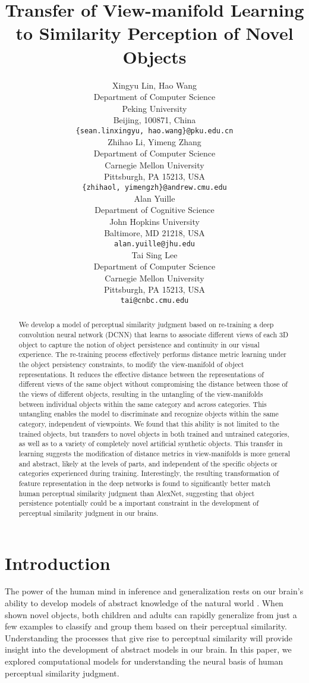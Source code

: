 \documentclass{article} %
\title{Transfer of View-manifold Learning to Similarity Perception of Novel Objects}
\author{Xingyu Lin, Hao Wang\\
Department of Computer Science\\
Peking University\\
Beijing, 100871, China \\
\texttt{\{sean.linxingyu, hao.wang\}@pku.edu.cn}\\
\And
Zhihao Li, Yimeng Zhang\\
Department of Computer Science\\
Carnegie Mellon University\\
Pittsburgh, PA 15213, USA \\
\texttt{\{zhihaol, yimengzh\}@andrew.cmu.edu} \\
\AND
Alan Yuille\\
Department of Cognitive Science\\
John Hopkins University\\
Baltimore, MD 21218, USA\\
\texttt{alan.yuille@jhu.edu} \\
\And
Tai Sing Lee\\
Department of Computer Science\\
Carnegie Mellon University\\
Pittsburgh, PA 15213, USA \\
\texttt{tai@cnbc.cmu.edu} \\
}
\begin{document}
\maketitle

\begin{abstract}
We develop a model of perceptual similarity judgment based on re-training a deep convolution neural network (DCNN) that learns to associate different views of each 3D object to capture the notion of object persistence and continuity in our visual experience. The re-training process effectively performs distance metric learning under the object persistency constraints, to modify the view-manifold of object representations. It reduces the effective distance between the representations of different views of the same object without compromising the distance between those of the views of different objects, resulting in the untangling of the view-manifolds between individual objects within the same category and across categories. This untangling enables the model to discriminate and recognize objects within the same category, independent of viewpoints. We found that this ability is not limited to the trained objects, but transfers to novel objects in both trained and untrained categories, as well as to a variety of completely novel artificial synthetic objects. This transfer in learning suggests the modification of distance metrics in view-manifolds is more general and abstract, likely at the levels of parts, and independent of the specific objects or categories experienced during training. Interestingly, the resulting transformation of feature representation in the deep networks is found to significantly better match human perceptual similarity judgment than AlexNet, suggesting that object persistence potentially could be a important constraint in the development of perceptual similarity judgment in our brains.
\end{abstract}

\section{Introduction}
The power of the human mind in inference and generalization rests on our brain's ability to develop models of abstract knowledge of the natural world \citep{tenenbaum2011grow}. When shown novel objects, both children and adults can rapidly generalize from just a few examples to classify and group them based on their perceptual similarity. Understanding the processes that give rise to perceptual similarity will provide insight into the development of abstract models in our brain. In this paper, we explored computational models for understanding the neural basis of human perceptual similarity judgment.
\end{document}
